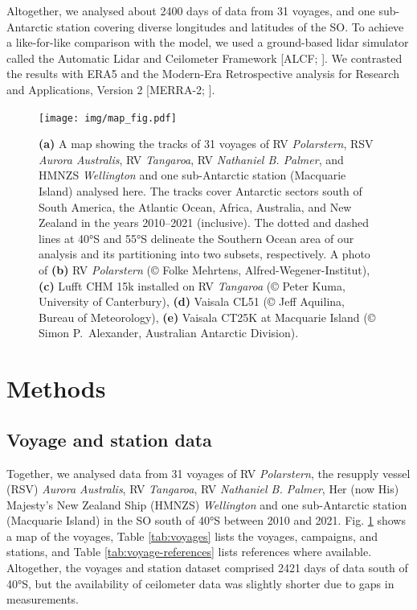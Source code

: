 \documentclass[12pt,a4paper]{article}
\begin{document}
Altogether, we analysed about 2400 days of data from 31 voyages, and one
sub-Antarctic station covering diverse longitudes and latitudes of the SO. To
achieve a like-for-like comparison with the model, we used a ground-based lidar
simulator called the Automatic Lidar and Ceilometer Framework [ALCF;
\cite{kuma2021}]. We contrasted the results with ERA5 \citep{era5} and the
Modern-Era Retrospective analysis for Research and Applications, Version 2
[MERRA-2; \cite{gelaro2017}].

\begin{figure}[b!]
\centering
\texttt{[image: img/map\_fig.pdf]}
\caption{
\textbf{(a)} A map showing the tracks of 31 voyages of RV \emph{Polarstern},
RSV \emph{Aurora Australis}, RV \emph{Tangaroa}, RV \emph{Nathaniel B. Palmer},
and HMNZS \emph{Wellington} and one sub-Antarctic station (Macquarie Island)
analysed here. The tracks cover Antarctic sectors south of South America, the
Atlantic Ocean, Africa, Australia, and New Zealand in the years 2010--2021
(inclusive).  The dotted and dashed lines at 40°S and 55°S delineate the
Southern Ocean area of our analysis and its partitioning into two subsets,
respectively.  A photo of \textbf{(b)} RV \emph{Polarstern} (© Folke Mehrtens,
Alfred-Wegener-Institut), \textbf{(c)} Lufft CHM 15k installed on RV
\emph{Tangaroa} (© Peter Kuma, University of Canterbury), \textbf{(d)} Vaisala
CL51 (© Jeff Aquilina, Bureau of Meteorology), \textbf{(e)} Vaisala CT25K at
Macquarie Island (© Simon P.\ Alexander, Australian Antarctic Division).
}
\label{fig:map}
\end{figure}

\section{Methods}
\label{sec:methods}

\subsection{Voyage and station data}

Together, we analysed data from 31 voyages of RV \emph{Polarstern}, the
resupply vessel (RSV) \emph{Aurora Australis}, RV \emph{Tangaroa}, RV
\emph{Nathaniel B.  Palmer}, Her (now His) Majesty's New Zealand Ship (HMNZS)
\emph{Wellington} and one sub-Antarctic station (Macquarie Island) in the SO
south of 40°S between 2010 and 2021. Fig. \ref{fig:map} shows a map of the
voyages, Table \ref{tab:voyages} lists the voyages, campaigns, and stations, and
Table \ref{tab:voyage-references} lists references where available. Altogether,
the voyages and station dataset comprised 2421 days of data south of 40°S, but
the availability of ceilometer data was slightly shorter due to gaps in
measurements.
\end{document}
